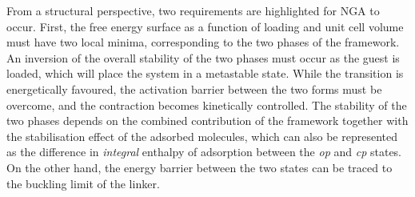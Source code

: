 From a structural perspective, two requirements are 
highlighted for NGA to occur.
First, the free energy surface as a function of loading and 
unit cell volume must have two local minima, corresponding to the 
two phases of the framework. An inversion of the overall stability
of the two phases must occur as the guest is loaded, which will 
place the system in a metastable state. While the transition
is energetically favoured, the activation barrier between the 
two forms must be overcome, and the contraction becomes 
kinetically controlled. The stability of the two phases 
depends on the combined contribution of the framework together
with the stabilisation effect of the adsorbed molecules,
which can also be represented as the
difference in \textit{integral} enthalpy of adsorption between the 
\textit{op} and \textit{cp} states. On the other hand, the 
energy barrier between the two states can be traced to the 
buckling limit of the linker.
